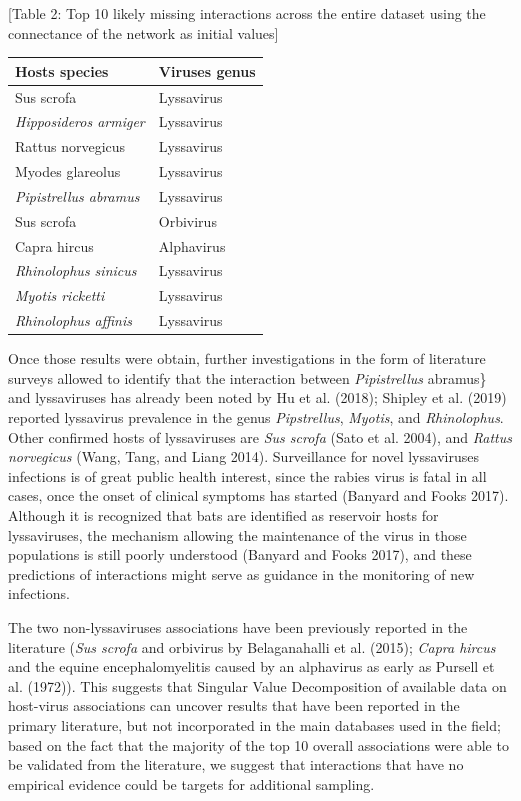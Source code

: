 \documentclass[11pt]{article}
\begin{document}
{[}Table 2: Top 10 likely missing interactions across the entire dataset
using the connectance of the network as initial values{]}

\begin{longtable}[]{@{}ll@{}}
\toprule
Hosts species & Viruses genus\tabularnewline
\midrule
\endhead
Sus scrofa & Lyssavirus\tabularnewline
\emph{Hipposideros armiger} & Lyssavirus\tabularnewline
Rattus norvegicus & Lyssavirus\tabularnewline
Myodes glareolus & Lyssavirus\tabularnewline
\emph{Pipistrellus abramus} & Lyssavirus\tabularnewline
Sus scrofa & Orbivirus\tabularnewline
Capra hircus & Alphavirus\tabularnewline
\emph{Rhinolophus sinicus} & Lyssavirus\tabularnewline
\emph{Myotis ricketti} & Lyssavirus\tabularnewline
\emph{Rhinolophus affinis} & Lyssavirus\tabularnewline
\bottomrule
\end{longtable}

Once those results were obtain, further investigations in the form of
literature surveys allowed to identify that the interaction between
\emph{Pipistrellus} abramus\} and lyssaviruses has already been noted by
Hu et al. (2018); Shipley et al. (2019) reported lyssavirus prevalence
in the genus \emph{Pipstrellus}, \emph{Myotis}, and \emph{Rhinolophus}.
Other confirmed hosts of lyssaviruses are \emph{Sus scrofa} (Sato et al.
2004), and \emph{Rattus norvegicus} (Wang, Tang, and Liang 2014).
Surveillance for novel lyssaviruses infections is of great public health
interest, since the rabies virus is fatal in all cases, once the onset
of clinical symptoms has started (Banyard and Fooks 2017). Although it
is recognized that bats are identified as reservoir hosts for
lyssaviruses, the mechanism allowing the maintenance of the virus in
those populations is still poorly understood (Banyard and Fooks 2017),
and these predictions of interactions might serve as guidance in the
monitoring of new infections.

The two non-lyssaviruses associations have been previously reported in
the literature (\emph{Sus scrofa} and orbivirus by Belaganahalli et al.
(2015); \emph{Capra hircus} and the equine encephalomyelitis caused by
an alphavirus as early as Pursell et al. (1972)). This suggests that
Singular Value Decomposition of available data on host-virus
associations can uncover results that have been reported in the primary
literature, but not incorporated in the main databases used in the
field; based on the fact that the majority of the top 10 overall
associations were able to be validated from the literature, we suggest
that interactions that have no empirical evidence could be targets for
additional sampling.
\end{document}

